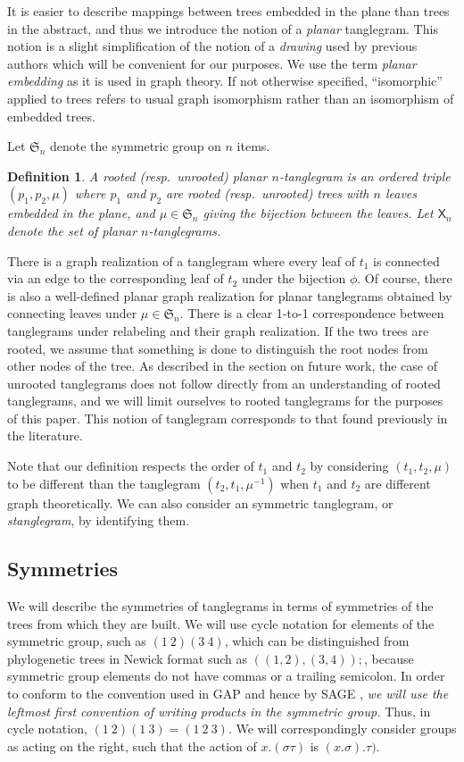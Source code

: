 \documentclass{amsart}
\newtheorem{definition}{Definition}
\newcommand{\fS}{\mathfrak S}
\newcommand{\pairing}{\mu}
\newcommand{\ptangle}{\mathsf{X}}
\begin{document}
It is easier to describe mappings between trees embedded in the plane than trees in the abstract, and thus we introduce the notion of a \emph{planar} tanglegram.
This notion is a slight simplification of the notion of a \emph{drawing} used by previous authors \cite{Venkatachalam2010-zh} which will be convenient for our purposes.
We use the term \emph{planar embedding} as it is used in graph theory.
If not otherwise specified, ``isomorphic'' applied to trees refers to usual graph isomorphism rather than an isomorphism of embedded trees.

Let $\fS_n$ denote the symmetric group on $n$ items.
\begin{definition}
\label{def:ptanglegram}
A rooted (resp.\ unrooted) \emph{planar $n$-tanglegram} is an ordered triple $(p_1, p_2, \pairing)$ where $p_1$ and $p_2$ are rooted (resp.\ unrooted) trees with $n$ leaves embedded in the plane, and $\pairing \in \fS_n$ giving the bijection between the leaves.
Let $\ptangle_n$ denote the set of planar $n$-tanglegrams.
\end{definition}

There is a graph realization of a tanglegram where every leaf of $t_1$ is connected via an edge to the corresponding leaf of $t_2$ under the bijection $\phi$.
Of course, there is also a well-defined planar graph realization for planar tanglegrams obtained by connecting leaves under $\pairing \in \fS_n$.
There is a clear 1-to-1 correspondence between tanglegrams under relabeling and their graph realization.
If the two trees are rooted, we assume that something is done to distinguish the root nodes from other nodes of the tree.
As described in the section on future work, the case of unrooted tanglegrams does not follow directly from an understanding of rooted tanglegrams, and we will limit ourselves to rooted tanglegrams for the purposes of this paper.
This notion of tanglegram corresponds to that found previously in the literature.

Note that our definition respects the order of $t_1$ and $t_2$ by considering $(t_1, t_2, \pairing)$ to be different than the tanglegram $(t_2, t_1, \pairing^{-1})$ when $t_1$ and $t_2$ are different graph theoretically.
We can also consider an symmetric tanglegram, or \emph{stanglegram}, by identifying them.


\subsection{Symmetries}
We will describe the symmetries of tanglegrams in terms of symmetries of the trees from which they are built.
We will use cycle notation for elements of the symmetric group, such as $(1\ 2) (3\ 4)$, which can be distinguished from phylogenetic trees in Newick format \cite{wiki:newick} such as $((1,2),(3,4));$, because symmetric group elements do not have commas or a trailing semicolon.
In order to conform to the convention used in GAP \cite{GAP4} and hence by SAGE \cite{SteinJoyner2005}, \emph{we will use the leftmost first convention of writing products in the symmetric group.}
Thus, in cycle notation, $(1\ 2) (1\ 3) = (1\ 2\ 3)$.
We will correspondingly consider groups as acting on the right, such that the action of $x.(\sigma \tau)$ is $(x.\sigma) . \tau)$.
\end{document}
